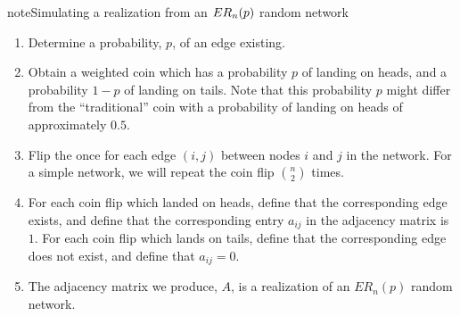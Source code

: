 \documentclass[letterpaper,10pt,english]{jupyterBook}
\begin{document}
\begin{sphinxadmonition}{note}{Simulating a realization from an \protect\(ER_n(p)\protect\) random network}
\begin{enumerate}
%
\item {} 
\sphinxAtStartPar
Determine a probability, \(p\), of an edge existing.

\item {} 
\sphinxAtStartPar
Obtain a weighted coin which has a probability \(p\) of landing on heads, and a probability \(1 - p\) of landing on tails. Note that this probability \(p\) might differ from the “traditional” coin with a probability of landing on heads of approximately \(0.5\).

\item {} 
\sphinxAtStartPar
Flip the once for each  edge \((i, j)\) between nodes \(i\) and \(j\) in the network. For a simple network, we will repeat the coin flip \(\binom n 2\) times.

\item {} 
\sphinxAtStartPar
For each coin flip which landed on heads, define that the corresponding edge exists, and define that the corresponding entry \(a_{ij}\) in the adjacency matrix is \(1\). For each coin flip which lands on tails, define that the corresponding edge does not exist, and define that \(a_{ij} = 0\).

\item {} 
\sphinxAtStartPar
The adjacency matrix we produce, \(A\), is a realization of an \(ER_n(p)\) random network.

\end{enumerate}
\end{sphinxadmonition}
\end{document}
